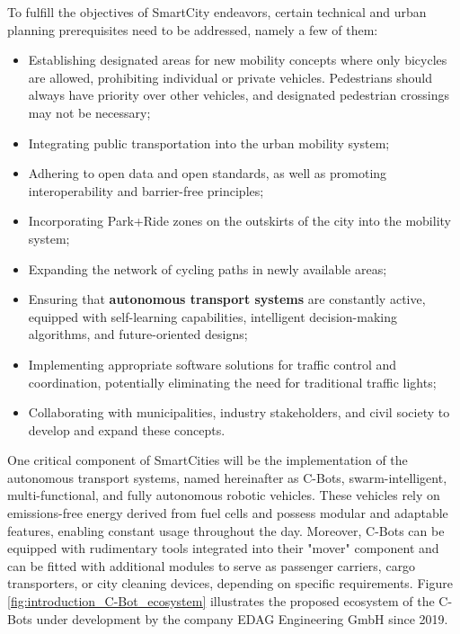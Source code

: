 To fulfill the objectives of SmartCity endeavors, certain technical and urban planning prerequisites need to be addressed, namely a few of them:

\begin{itemize}
    \item Establishing designated areas for new mobility concepts where only bicycles are allowed, prohibiting individual or private vehicles. Pedestrians should always have priority over other vehicles, and designated pedestrian crossings may not be necessary;
    \item Integrating public transportation into the urban mobility system;
    \item Adhering to open data and open standards, as well as promoting interoperability and barrier-free principles;
    \item Incorporating Park+Ride zones on the outskirts of the city into the mobility system;
    \item Expanding the network of cycling paths in newly available areas;
    \item Ensuring that \textbf{autonomous transport systems} are constantly active, equipped with self-learning capabilities, intelligent decision-making algorithms, and future-oriented designs;
    \item Implementing appropriate software solutions for traffic control and coordination, potentially eliminating the need for traditional traffic lights;
    \item Collaborating with municipalities, industry stakeholders, and civil society to develop and expand these concepts.
\end{itemize}

One critical component of SmartCities will be the implementation of the autonomous transport systems, named hereinafter as C-Bots, swarm-intelligent, multi-functional, and fully autonomous robotic vehicles. These vehicles rely on emissions-free energy derived from fuel cells and possess modular and adaptable features, enabling constant usage throughout the day. Moreover, C-Bots can be equipped with rudimentary tools integrated into their "mover" component and can be fitted with additional modules to serve as passenger carriers, cargo transporters, or city cleaning devices, depending on specific requirements. Figure \ref{fig:introduction_C-Bot_ecosystem} illustrates the proposed ecosystem of the C-Bots under development by the company EDAG Engineering GmbH since 2019.

